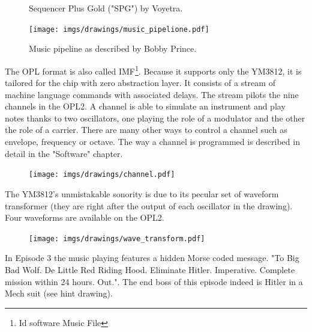 \documentclass[book.tex]{subfiles}
\begin{document}
\begin{figure}[H]
\centering
\caption{Sequencer Plus Gold ("SPG") by Voyetra.}
\end{figure}

\begin{figure}[H]
\centering

 \texttt{[image: imgs/drawings/music\_pipelione.pdf]}
 \caption{Music pipeline as described by Bobby Prince.}
\end{figure}
The OPL format is also called IMF\footnote{Id software Music File}. Because it supports only the YM3812, it is tailored for the chip with zero abstraction layer. It consists of a stream of machine language commands with associated delays. The stream pilots the nine channels in the OPL2. A channel is able to simulate an instrument and play notes thanks to two oscillators, one playing the role of a modulator and the other the role of a carrier. There are many other ways to control a channel such as envelope, frequency or octave. The way a channel is programmed is described in detail in the "Software" chapter.
\begin{figure}[H]
\centering
 \texttt{[image: imgs/drawings/channel.pdf]}
\end{figure}
\par
{}  The YM3812's unmistakable sonority is due to its pecular set of waveform transformer (they are right after the output of each oscillator in the drawing). Four waveforms are available on the OPL2.
\par
\begin{figure}[H]
\centering
 \texttt{[image: imgs/drawings/wave\_transform.pdf]}
\end{figure}


 In Episode 3 the music playing features a hidden Morse coded message. "To Big Bad Wolf. De Little Red Riding Hood. Eliminate Hitler. Imperative. Complete mission within 24 hours. Out.". The end boss of this episode indeed is Hitler in a Mech suit (see hint drawing).
\end{document}
